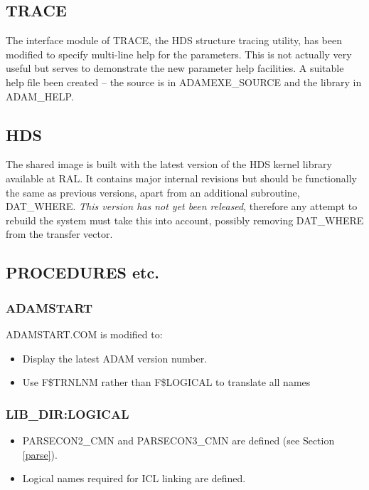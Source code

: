 \subsection{TRACE}
\label{trace}
The interface module of TRACE, the HDS structure tracing utility, has been
modified to specify multi-line help for the parameters.
This is not actually very useful but serves to demonstrate the new parameter
help facilities.
A suitable help file been created -- the source is in ADAMEXE\_SOURCE and the
library in ADAM\_HELP.

\subsection{HDS}
The shared image is built with the latest version of the HDS kernel library
available at RAL. 
It contains major internal revisions but should be functionally the same as 
previous versions, apart from an additional subroutine, DAT\_WHERE.
{\em This version has not yet been released}, therefore any attempt to rebuild 
the system must take this into account, possibly removing DAT\_WHERE from the
transfer vector.

\subsection{PROCEDURES etc.}
\subsubsection{ADAMSTART}
ADAMSTART.COM is modified to:
\begin{itemize}
\item Display the latest ADAM version number.
\item Use F\$TRNLNM rather than F\$LOGICAL to translate all names
\end{itemize}

\subsubsection{LIB\_DIR:LOGICAL}
\begin{itemize}
\item PARSECON2\_CMN and PARSECON3\_CMN are defined (see Section \ref{parse}).
\item Logical names required for ICL linking are defined.
\end{itemize}

